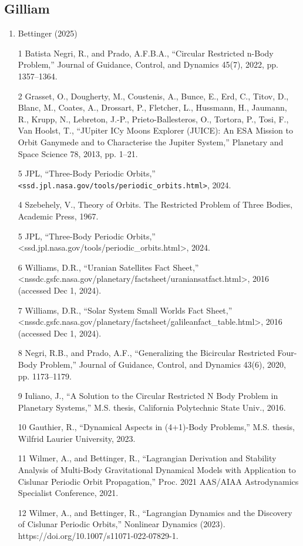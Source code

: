 \documentclass[12pt]{article}
\begin{document}
\subsection*{Gilliam}
\begin{enumerate}
\item Bettinger (2025)
\item [1] Batista Negri, R., and Prado, A.F.B.A., ``Circular Restricted n-Body Problem,'' Journal of Guidance, Control, and Dynamics 45(7), 2022, pp. 1357--1364.
\item [2] Grasset, O., Dougherty, M., Coustenis, A., Bunce, E., Erd, C., Titov, D., Blanc, M., Coates, A., Drossart, P., Fletcher, L., Hussmann, H., Jaumann, R., Krupp, N., Lebreton, J.-P., Prieto-Ballesteros, O., Tortora, P., Tosi, F., Van Hoolst, T., ``JUpiter ICy Moons Explorer (JUICE): An ESA Mission to Orbit Ganymede and to Characterise the Jupiter System,'' Planetary and Space Science 78, 2013, pp. 1--21.
\item [5] JPL, ``Three-Body Periodic Orbits,'' \texttt{<ssd.jpl.nasa.gov/tools/periodic\_orbits.html>}, 2024.
\item [4] Szebehely, V., Theory of Orbits. The Restricted Problem of Three Bodies, Academic Press, 1967.
\item [5] JPL, ``Three-Body Periodic Orbits,'' <ssd.jpl.nasa.gov/tools/periodic_orbits.html>, 2024.
\item [6] Williams, D.R., ``Uranian Satellites Fact Sheet,'' <nssdc.gsfc.nasa.gov/planetary/factsheet/uraniansatfact.html>, 2016 (accessed Dec 1, 2024).
\item [7] Williams, D.R., ``Solar System Small Worlds Fact Sheet,'' <nssdc.gsfc.nasa.gov/planetary/factsheet/galileanfact_table.html>, 2016 (accessed Dec 1, 2024).
\item [8] Negri, R.B., and Prado, A.F., ``Generalizing the Bicircular Restricted Four-Body Problem,'' Journal of Guidance, Control, and Dynamics 43(6), 2020, pp. 1173--1179.
\item [9] Iuliano, J., ``A Solution to the Circular Restricted N Body Problem in Planetary Systems,'' M.S. thesis, California Polytechnic State Univ., 2016.
\item [10] Gauthier, R., ``Dynamical Aspects in (4+1)-Body Problems,'' M.S. thesis, Wilfrid Laurier University, 2023.
\item [11] Wilmer, A., and Bettinger, R., ``Lagrangian Derivation and Stability Analysis of Multi-Body Gravitational Dynamical Models with Application to Cislunar Periodic Orbit Propagation,'' Proc. 2021 AAS/AIAA Astrodynamics Specialist Conference, 2021.
\item [12] Wilmer, A., and Bettinger, R., ``Lagrangian Dynamics and the Discovery of Cislunar Periodic Orbits,'' Nonlinear Dynamics (2023). https://doi.org/10.1007/s11071-022-07829-1.
\end{enumerate}
\end{document}
